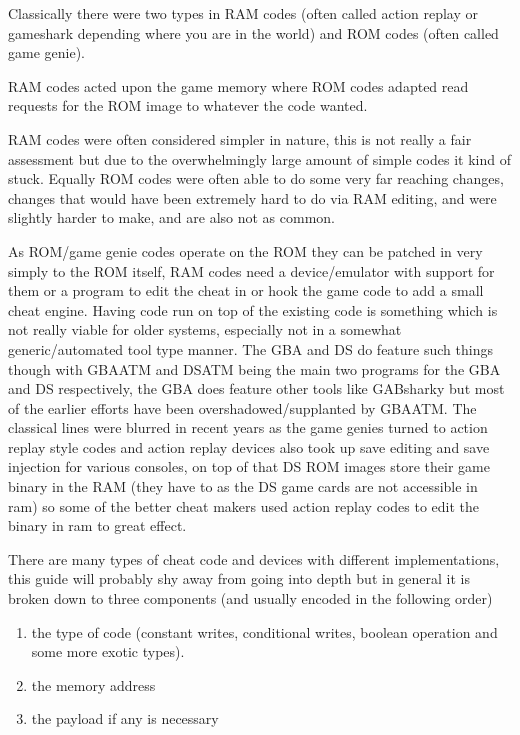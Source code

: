 \documentclass[
]{book}
\begin{document}
Classically there were two types in RAM codes (often called action replay or gameshark depending where you are in the world) and ROM codes (often called game genie).

RAM codes acted upon the game memory where ROM codes adapted read requests for the ROM image to whatever the code wanted.

RAM codes were often considered simpler in nature, this is not really a fair assessment but due to the overwhelmingly large amount of simple codes it kind of stuck. Equally ROM codes were often able to do some very far reaching changes, changes that would have been extremely hard to do via RAM editing, and were slightly harder to make, and are also not as common.

As ROM/game genie codes operate on the ROM they can be patched in very simply to the ROM itself, RAM codes need a device/emulator with support for them or a program to edit the cheat in or hook the game code to add a small cheat engine. Having code run on top of the existing code is something which is not really viable for older systems, especially not in a somewhat generic/automated tool type manner. The GBA and DS do feature such things though with GBAATM and DSATM being the main two programs for the GBA and DS respectively, the GBA does feature other tools like GABsharky but most of the earlier efforts have been overshadowed/supplanted by GBAATM. The classical lines were blurred in recent years as the game genies turned to action replay style codes and action replay devices also took up save editing and save injection for various consoles, on top of that DS ROM images store their game binary in the RAM (they have to as the DS game cards are not accessible in ram) so some of the better cheat makers used action replay codes to edit the binary in ram to great effect.

There are many types of cheat code and devices with different implementations, this guide will probably shy away from going into depth but in general it is broken down to three components (and usually encoded in the following order)

\begin{enumerate}
\def\labelenumi{\arabic{enumi})}
\item
  the type of code (constant writes, conditional writes, boolean operation and some more exotic types).
\item
  the memory address
\item
  the payload if any is necessary
\end{enumerate}
\end{document}
